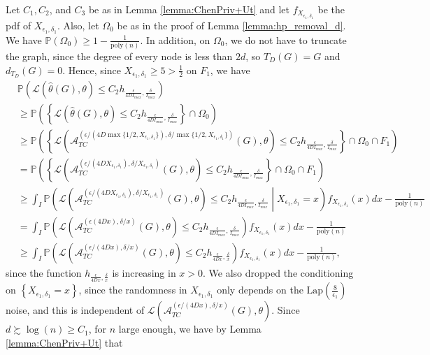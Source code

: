\documentclass{article}
\newcommand{\thetahat}{\ensuremath{\widehat{\theta}}}
\begin{document}
Let $C_1, C_2$, and $C_3$ be as in Lemma \ref{lemma:ChenPriv+Ut} and let $f_{X_{\epsilon_1, \delta_1}}$ be the pdf of $X_{\epsilon_1, \delta_1}$. Also, let $\Omega_0$ be as in the proof of Lemma \ref{lemma:hp_removal_d}. We have $\mathbb{P}(\Omega_0) \geq 1 - \frac{1}{\mathrm{poly}(n)}$. In addition, on $\Omega_0$, we do not have to truncate the graph, since the degree of every node is less than $2d$, so $T_{D}(G) = G$ and $d_{T_{D}}(G) = 0$. Hence, since $X_{\epsilon_1, \delta_1} \geq 5 > \frac{1}{2}$ on $F_1$, we have
\begin{align*}
&\mathbb{P}\left(\mathcal{L}\left(\thetahat(G), \theta\right) \leq C_2h_{\frac{\epsilon}{4DI_{max}}, \frac{\delta}{I_{max}}}\right)\\
&\geq \mathbb{P}\left(\left\{\mathcal{L}\left(\thetahat(G), \theta\right) \leq C_2h_{\frac{\epsilon}{4DI_{max}}, \frac{\delta}{I_{max}}}\right\} \cap \Omega_0\right)\\
&\geq \mathbb{P}\left(\left\{\mathcal{L}\left(\mathcal{A}_{TC}^{\left(\epsilon/(4D\max\{1/2, X_{\epsilon_1, \delta_1}\}), \delta/\max\{1/2, X_{\epsilon_1, \delta_1}\}\right)}(G), \theta\right) \leq C_2h_{\frac{\epsilon}{4DI_{max}}, \frac{\delta}{I_{max}}}\right\} \cap \Omega_0 \cap F_1\right)\\
&= \mathbb{P}\left(\left\{\mathcal{L}\left(\mathcal{A}_{TC}^{\left(\epsilon/(4DX_{\epsilon_1, \delta_1}), \delta/X_{\epsilon_1, \delta_1}\right)}(G), \theta\right) \leq C_2h_{\frac{\epsilon}{4DI_{max}}, \frac{\delta}{I_{max}}}\right\} \cap \Omega_0 \cap F_1\right)\\
&\geq \int_I\mathbb{P}\left(\mathcal{L}\left(\mathcal{A}_{TC}^{\left(\epsilon/(4DX_{\epsilon_1, \delta_1}), \delta/X_{\epsilon_1, \delta_1}\right)}(G), \theta\right) \leq C_2h_{\frac{\epsilon}{4DI_{max}}, \frac{\delta}{I_{max}}}\middle\vert X_{\epsilon_1, \delta_1} = x\right)f_{X_{\epsilon_1, \delta_1}}(x)dx - \frac{1}{\mathrm{poly}(n)}\\
&= \int_I\mathbb{P}\left(\mathcal{L}\left(\mathcal{A}_{TC}^{\left(\epsilon(4Dx), \delta/x\right)}(G), \theta\right) \leq C_2h_{\frac{\epsilon}{4DI_{max}}, \frac{\delta}{I_{max}}}\right)f_{X_{\epsilon_1, \delta_1}}(x)dx - \frac{1}{\mathrm{poly}(n)}\\
&\geq \int_I\mathbb{P}\left(\mathcal{L}\left(\mathcal{A}_{TC}^{\left(\epsilon/(4Dx), \delta/x\right)}(G), \theta\right) \leq C_2h_{\frac{\epsilon}{4Dx}, \frac{\delta}{x}}\right)f_{X_{\epsilon_1, \delta_1}}(x)dx - \frac{1}{\mathrm{poly}(n)},
\end{align*}
since the function $h_{\frac{\epsilon}{4Dx}, \frac{\delta}{x}}$ is increasing in $x > 0$. We also dropped the conditioning on $\left\{X_{\epsilon_1, \delta_1} = x\right\}$, since the randomness in $X_{\epsilon_1, \delta_1}$ only depends on the $\mathrm{Lap}\left(\frac{8}{\epsilon_1}\right)$ noise, and this is independent of $\mathcal{L}\left(\mathcal{A}_{TC}^{(\epsilon/(4Dx), \delta/x)}(G), \theta\right)$. Since $d \succsim \log(n) \geq C_1$, for $n$ large enough, we have by Lemma \ref{lemma:ChenPriv+Ut} that
\end{document}
